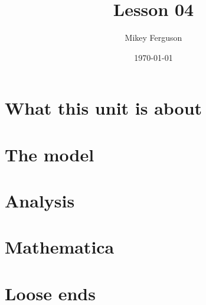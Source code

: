 \documentclass[11pt]{article}
\title{Lesson 04}
\author{Mikey Ferguson}
\date{\today}
\begin{document}
\maketitle
\tableofcontents
\bigskip

\section{What this unit is about}

\section{The model}

\section{Analysis}

\section{Mathematica}

\section{Loose ends}
\end{document}
